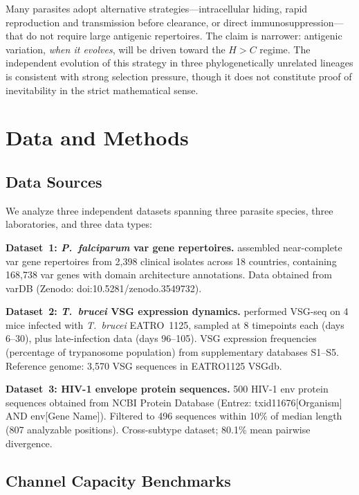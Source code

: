 \documentclass[twocolumn,10pt]{article}
\begin{document}
Many parasites adopt alternative strategies---intracellular hiding, rapid reproduction and transmission before clearance, or direct immunosuppression---that do not require large antigenic repertoires.  The claim is narrower: antigenic variation, \emph{when it evolves}, will be driven toward the $H > C$ regime.  The independent evolution of this strategy in three phylogenetically unrelated lineages is consistent with strong selection pressure, though it does not constitute proof of inevitability in the strict mathematical sense.

\section{Data and Methods}
\label{sec:data}

\subsection{Data Sources}

We analyze three independent datasets spanning three parasite species, three laboratories, and three data types:

\textbf{Dataset~1: \textit{P.~falciparum} var gene repertoires.}  \citet{otto2019} assembled near-complete var gene repertoires from 2,398 clinical isolates across 18 countries, containing 168,738 var genes with domain architecture annotations.  Data obtained from varDB (Zenodo: doi:10.5281/zenodo.3549732).

\textbf{Dataset~2: \textit{T.~brucei} VSG expression dynamics.}  \citet{mugnier2015} performed VSG-seq on 4 mice infected with \textit{T.~brucei} EATRO~1125, sampled at 8 timepoints each (days 6--30), plus late-infection data (days 96--105).  VSG expression frequencies (percentage of trypanosome population) from supplementary databases S1--S5.  Reference genome: 3,570 VSG sequences in EATRO1125 VSGdb.

\textbf{Dataset~3: HIV-1 envelope protein sequences.}  500 HIV-1 env protein sequences obtained from NCBI Protein Database (Entrez: txid11676[Organism] AND env[Gene Name]).  Filtered to 496 sequences within 10\% of median length (807 analyzable positions).  Cross-subtype dataset; 80.1\% mean pairwise divergence.

\subsection{Channel Capacity Benchmarks}
\end{document}
